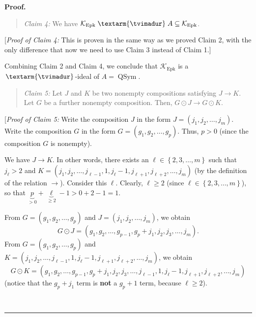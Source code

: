 \documentclass[numbers=enddot,12pt,final,onecolumn,notitlepage]{scrartcl}%
\theoremstyle{definition}
\newenvironment{statement}{\begin{quote}}{\end{quote}}
\newenvironment{proof}[1][Proof]{\noindent\textbf{#1.} }{\ \rule{0.5em}{0.5em}}
\newenvironment{verlong}{}{}
\newcommand{\tvi}{\left. \textarm{\tvimadur} \right.}
\begin{document}
\begin{verlong}
\begin{proof}
\begin{statement}
\textit{Claim 4:} We have $\mathcal{K}_{\operatorname*{Epk}}\tvi  A\subseteq
\mathcal{K}_{\operatorname*{Epk}}$.
\end{statement}

[\textit{Proof of Claim 4:} This is proven in the same way as we proved Claim
2, with the only difference that now we need to use Claim 3 instead of Claim 1.]

Combining Claim 2 and Claim 4, we conclude that $\mathcal{K}%
_{\operatorname*{Epk}}$ is a $\tvi  $-ideal of $A=\operatorname*{QSym}$.

\begin{statement}
\textit{Claim 5:} Let $J$ and $K$ be two nonempty compositions satisfying
$J\rightarrow K$. Let $G$ be a further nonempty composition. Then, $G\odot
J\rightarrow G\odot K$.
\end{statement}

[\textit{Proof of Claim 5:} Write the composition $J$ in the form $J=\left(
j_{1},j_{2},\ldots,j_{m}\right)  $. Write the composition $G$ in the form
$G=\left(  g_{1},g_{2},\ldots,g_{p}\right)  $. Thus, $p>0$ (since the
composition $G$ is nonempty).

We have $J\rightarrow K$. In other words, there exists an $\ell\in\left\{
2,3,\ldots,m\right\}  $ such that $j_{\ell}>2$ and $K=\left(  j_{1}%
,j_{2},\ldots,j_{\ell-1},1,j_{\ell}-1,j_{\ell+1},j_{\ell+2},\ldots
,j_{m}\right)  $ (by the definition of the relation $\rightarrow$). Consider
this $\ell$. Clearly, $\ell\geq2$ (since $\ell\in\left\{  2,3,\ldots
,m\right\}  $), so that $\underbrace{p}_{>0}+\underbrace{\ell}_{\geq
2}-1>0+2-1=1$.

From $G=\left(  g_{1},g_{2},\ldots,g_{p}\right)  $ and $J=\left(  j_{1}%
,j_{2},\ldots,j_{m}\right)  $, we obtain%
\begin{equation}
G\odot J=\left(  g_{1},g_{2},\ldots,g_{p-1},g_{p}+j_{1},j_{2},j_{3}%
,\ldots,j_{m}\right)  . \label{pf.thm.Epk.dend.c5.pf.GJ=}%
\end{equation}
From $G=\left(  g_{1},g_{2},\ldots,g_{p}\right)  $ and $K=\left(  j_{1}%
,j_{2},\ldots,j_{\ell-1},1,j_{\ell}-1,j_{\ell+1},j_{\ell+2},\ldots
,j_{m}\right)  $, we obtain%
\begin{equation}
G\odot K=\left(  g_{1},g_{2},\ldots,g_{p-1},g_{p}+j_{1},j_{2},j_{3}%
,\ldots,j_{\ell-1},1,j_{\ell}-1,j_{\ell+1},j_{\ell+2},\ldots,j_{m}\right)
\label{pf.thm.Epk.dend.c5.pf.GK=}%
\end{equation}
(notice that the $g_{p}+j_{1}$ term is \textbf{not} a $g_{p}+1$ term, because
$\ell\geq2$).


\end{proof}
\end{verlong}
\end{document}
